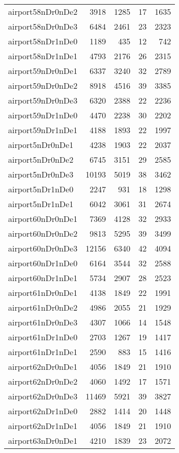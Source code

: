 \begin{longtable}{lrrrr}
airport58nDr0nDe2 & 3918 & 1285 & 17 & 1635 \\
airport58nDr0nDe3 & 6484 & 2461 & 23 & 2323 \\
airport58nDr1nDe0 & 1189 & 435 & 12 & 742 \\
airport58nDr1nDe1 & 4793 & 2176 & 26 & 2315 \\
airport59nDr0nDe1 & 6337 & 3240 & 32 & 2789 \\
airport59nDr0nDe2 & 8918 & 4516 & 39 & 3385 \\
airport59nDr0nDe3 & 6320 & 2388 & 22 & 2236 \\
airport59nDr1nDe0 & 4470 & 2238 & 30 & 2202 \\
airport59nDr1nDe1 & 4188 & 1893 & 22 & 1997 \\
airport5nDr0nDe1 & 4238 & 1903 & 22 & 2037 \\
airport5nDr0nDe2 & 6745 & 3151 & 29 & 2585 \\
airport5nDr0nDe3 & 10193 & 5019 & 38 & 3462 \\
airport5nDr1nDe0 & 2247 & 931 & 18 & 1298 \\
airport5nDr1nDe1 & 6042 & 3061 & 31 & 2674 \\
airport60nDr0nDe1 & 7369 & 4128 & 32 & 2933 \\
airport60nDr0nDe2 & 9813 & 5295 & 39 & 3499 \\
airport60nDr0nDe3 & 12156 & 6340 & 42 & 4094 \\
airport60nDr1nDe0 & 6164 & 3544 & 32 & 2588 \\
airport60nDr1nDe1 & 5734 & 2907 & 28 & 2523 \\
airport61nDr0nDe1 & 4138 & 1849 & 22 & 1991 \\
airport61nDr0nDe2 & 4986 & 2055 & 21 & 1929 \\
airport61nDr0nDe3 & 4307 & 1066 & 14 & 1548 \\
airport61nDr1nDe0 & 2703 & 1267 & 19 & 1417 \\
airport61nDr1nDe1 & 2590 & 883 & 15 & 1416 \\
airport62nDr0nDe1 & 4056 & 1849 & 21 & 1910 \\
airport62nDr0nDe2 & 4060 & 1492 & 17 & 1571 \\
airport62nDr0nDe3 & 11469 & 5921 & 39 & 3827 \\
airport62nDr1nDe0 & 2882 & 1414 & 20 & 1448 \\
airport62nDr1nDe1 & 4056 & 1849 & 21 & 1910 \\
airport63nDr0nDe1 & 4210 & 1839 & 23 & 2072 \\

\end{longtable}

